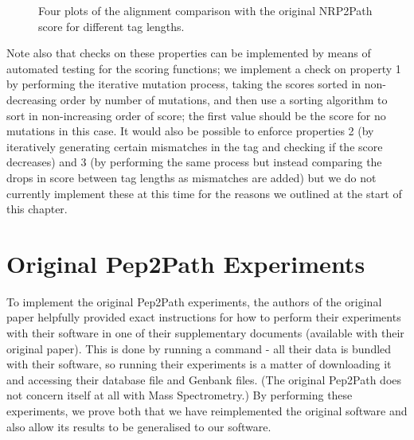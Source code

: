 \documentclass{l4proj}
\begin{document}
\begin{figure} \label{fig:p2ps}
    \centering

    \caption{Four plots of the alignment comparison with the original NRP2Path score for different tag lengths.}

    \label{fig:p2ps}
\end{figure}

Note also that checks on these properties can be implemented by means of automated testing for the scoring functions; we implement a check on property 1 by performing the iterative mutation process, taking the scores sorted in non-decreasing order by number of mutations, and then use a sorting algorithm to sort in non-increasing order of score; the first value should be the score for no mutations in this case. It would also be possible to enforce properties 2 (by iteratively generating certain mismatches in the tag and checking if the score decreases) and 3 (by performing the same process but instead comparing the drops in score between tag lengths as mismatches are added) but we do not currently implement these at this time for the reasons we outlined at the start of this chapter.

\section{Original Pep2Path Experiments}

To implement the original Pep2Path experiments, the authors of the original paper helpfully provided exact instructions for how to perform their experiments with their software in one of their supplementary documents (available with their original paper). This is done by running a command - all their data is bundled with their software, so running their experiments is a matter of downloading it and accessing their database file and Genbank files. (The original Pep2Path does not concern itself at all with Mass Spectrometry.) By performing these experiments, we prove both that we have reimplemented the original software and also allow its results to be generalised to our software.
\end{document}
